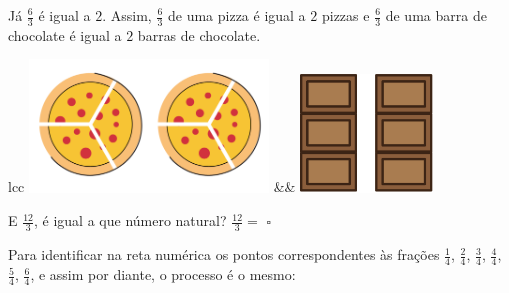 Já $\frac{6}{3}$ é igual a $2$. Assim, $\frac{6}{3}$ de uma pizza é igual a $2$ pizzas e $\frac{6}{3}$ de uma barra de chocolate é igual a $2$ barras de chocolate.

\begin{center}
\begin{tabular}{lcc}
\includegraphics[width=180pt, keepaspectratio]{../figuras/licao03/orgideias_fig_a_2.png} &\quad &
\includegraphics[width=100pt, keepaspectratio]{../figuras/licao03/orgideias_fig_b_2.png} \\
  {
  }
\end{tabular}
\end{center}


E $\frac{12}{3}$, é igual a que número natural? $\frac{12}{3}=$ {\Large $\square$}

Para identificar na reta numérica os pontos correspondentes às frações $\frac{1}{4}$, $\frac{2}{4}$, $\frac{3}{4}$, $\frac{4}{4}$, $\frac{5}{4}$, $\frac{6}{4}$, e assim por diante, o processo é o mesmo:

